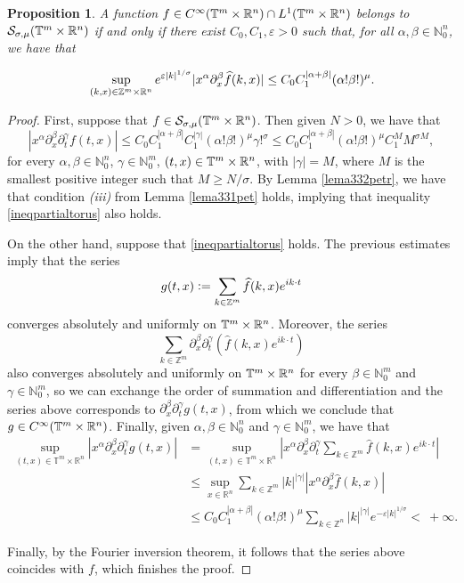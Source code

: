 \documentclass[11pt,reqno]{amsart}
\numberwithin{equation}{section}
\newtheorem{prop}[theorem]{Proposition}
\theoremstyle{definition}
\theoremstyle{definition}
\newcommand{\T}{\mathbb{T}}
\newcommand{\G}{\mathnormal{\mathbb{T}^{m}\times\mathbb{R}^n}}
\newcommand{\R}{\mathbb{R}}
\newcommand{\Z}{\mathbb{Z}}
\newcommand{\N}{\mathbb{N}}
\renewcommand{\S}{\mathcal{S}_{\sigma,\mu}(\G)}
\newcommand{\defeq}{\vcentcolon=}
\begin{document}
    \begin{prop}\label{proppartialdecayrn}
    A function $f\in C^\infty(\G)\cap L^1(\T^m\times\R^n)$ belongs to $\S$ if and only if there exist $C_0,C_1,\varepsilon>0$ such that, for all $\alpha,\beta\in\N_0^n$, we have that
    
    \begin{equation}{\label{ineqpartialtorus}}
	\sup_{(k,x)\in\Z^m\times\R^n}e^{\varepsilon |k|^{1/\sigma}}|x^\alpha\partial_x^\beta\widehat{f}(k,x)|\leq C_0C_1^{|\alpha+\beta|}(\alpha!\beta!)^{\mu} .
    \end{equation}
    \end{prop}
    \begin{proof}
    First, suppose that $f\in\S$. Then given $N>0$, we have that
    \[|x^\alpha \partial_x^\beta\partial_t^\gamma f(t,x)|\leq C_0C_1^{|\alpha+\beta|}C_1^{|\gamma|}(\alpha!\beta!)^\mu\gamma!^\sigma \leq C_0 C_1^{|\alpha+\beta|}(\alpha!\beta!)^\mu C_1^{M}M^{\sigma M},\]
    for every $\alpha,\beta\in\N_0^n$, $\gamma\in\N_0^m$, $(t,x)\in\G$, with $|\gamma|=M$, where $M$ is the smallest positive integer such that $M\geq N/\sigma$. By Lemma \ref{lema332petr}, we have that condition {\it (iii)} from Lemma \ref{lema331pet} holds, implying that inequality \eqref{ineqpartialtorus} also holds.

    On the other hand, suppose that \eqref{ineqpartialtorus} holds. The previous estimates imply that the series
    \[g(t,x)\defeq\sum_{k\in\Z^m}\widehat{f}(k,x)e^{ik\cdot t}\]
    converges absolutely and uniformly on $\G$. Moreover, the series 
    \[\sum_{k\in\Z^m}\partial_x^\beta\partial_t^\gamma\left(\widehat{f}(k,x)e^{ik\cdot t}\right)\]
    also converges absolutely and uniformly on $\G$ for every $\beta\in\N_0^m$ and $\gamma\in\N_0^m$, so we can exchange the order of summation and differentiation and the series above corresponds to $\partial_x^\beta\partial_t^\gamma g(t,x)$, from which we conclude that $g\in C^\infty(\G)$. Finally, given $\alpha,\beta\in\N_0^n$ and $\gamma\in\N_0^m$, we have that
    \begin{align*}
    \sup_{(t,x)\in\T^m\times \R^n}|x^\alpha \partial_x^\beta \partial_t^\gamma g(t,x)|&=  \sup_{(t,x)\in\T^m\times \R^n} \left|x^\alpha\partial_x^\beta\partial_t^\gamma\sum_{k\in\Z^m}\widehat{f}(k,x)e^{ik\cdot t}\right|\\ &\leq \sup_{x\in\R^n} \sum_{k\in\Z^m}|k|^{|\gamma|}|x^\alpha \partial_x^\beta\widehat{f}(k,x)|\\
    & \leq C_0C_1^{|\alpha+\beta|}(\alpha!\beta!)^\mu\sum_{k\in\Z^n} |k|^{|\gamma|}e^{-\varepsilon|k|^{1/\sigma}} <\ +\infty.
    \end{align*}
    
    Finally, by the Fourier inversion theorem, it follows that the series above coincides with $f$, which finishes the proof.
    \end{proof}
\end{document}
